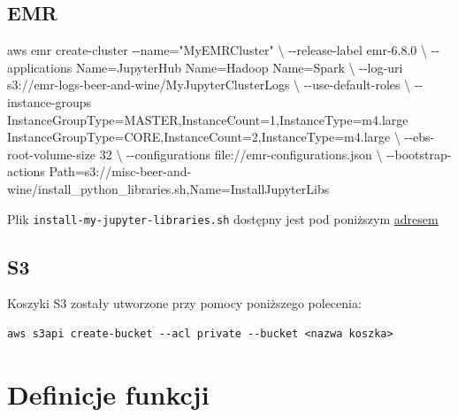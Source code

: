 \documentclass[
  letterpaper,
  DIV=11,
  numbers=noendperiod]{scrreprt}
\newenvironment{Shaded}{\begin{snugshade}}{\end{snugshade}}
\newcommand{\AttributeTok}[1]{\textcolor[rgb]{0.40,0.45,0.13}{#1}}
\newcommand{\DataTypeTok}[1]{\textcolor[rgb]{0.68,0.00,0.00}{#1}}
\newcommand{\ExtensionTok}[1]{\textcolor[rgb]{0.00,0.23,0.31}{#1}}
\newcommand{\NormalTok}[1]{\textcolor[rgb]{0.00,0.23,0.31}{#1}}
\newcommand{\OperatorTok}[1]{\textcolor[rgb]{0.37,0.37,0.37}{#1}}
\newcommand{\StringTok}[1]{\textcolor[rgb]{0.13,0.47,0.30}{#1}}
\begin{document}
\hypertarget{sec-emr}{%
\subsection{EMR}\label{sec-emr}}

\small

\begin{Shaded}
\begin{Highlighting}[]
\ExtensionTok{aws}\NormalTok{ emr create{-}cluster }\AttributeTok{{-}{-}name}\OperatorTok{=}\StringTok{"MyEMRCluster"} \DataTypeTok{\textbackslash{}}
    \AttributeTok{{-}{-}release{-}label}\NormalTok{ emr{-}6.8.0 }\DataTypeTok{\textbackslash{}}
    \AttributeTok{{-}{-}applications}\NormalTok{ Name=JupyterHub Name=Hadoop Name=Spark }\DataTypeTok{\textbackslash{}}
    \AttributeTok{{-}{-}log{-}uri}\NormalTok{ s3://emr{-}logs{-}beer{-}and{-}wine/MyJupyterClusterLogs }\DataTypeTok{\textbackslash{}}
    \AttributeTok{{-}{-}use{-}default{-}roles} \DataTypeTok{\textbackslash{}}
    \AttributeTok{{-}{-}instance{-}groups}\NormalTok{ InstanceGroupType=MASTER,InstanceCount=1,InstanceType=m4.large InstanceGroupType=CORE,InstanceCount=2,InstanceType=m4.large }\DataTypeTok{\textbackslash{}}
    \AttributeTok{{-}{-}ebs{-}root{-}volume{-}size}\NormalTok{ 32 }\DataTypeTok{\textbackslash{}}
    \AttributeTok{{-}{-}configurations}\NormalTok{ file://emr{-}configurations.json }\DataTypeTok{\textbackslash{}}
    \AttributeTok{{-}{-}bootstrap{-}actions}\NormalTok{ Path=s3://misc{-}beer{-}and{-}wine/install\_python\_libraries.sh,Name=InstallJupyterLibs}
\end{Highlighting}
\end{Shaded}

\normalsize

Plik \texttt{install-my-jupyter-libraries.sh} dostępny jest pod
poniższym \href{}{adresem}

\hypertarget{s3}{%
\subsection{S3}\label{s3}}

Koszyki S3 zostały utworzone przy pomocy poniższego polecenia:

\begin{verbatim}
aws s3api create-bucket --acl private --bucket <nazwa koszka>
\end{verbatim}

\hypertarget{definicje-funkcji}{%
\section{Definicje funkcji}\label{definicje-funkcji}}
\end{document}
